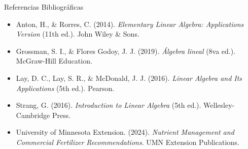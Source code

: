 \documentclass[
  spanish,
  aspectratio=169,
  xcolor={dvipsnames,table}
]{beamer}
\begin{document}
\begin{frame}{Referencias Bibliográficas}
  \fontsize{8}{10}\selectfont
  \begin{itemize}
    \item Anton, H., \& Rorres, C. (2014). \textit{Elementary Linear Algebra: Applications Version} (11th ed.). John Wiley \& Sons.
    \item Grossman, S. I., \& Flores Godoy, J. J. (2019). \textit{Álgebra lineal} (8va ed.). McGraw-Hill Education.
    \item Lay, D. C., Lay, S. R., \& McDonald, J. J. (2016). \textit{Linear Algebra and Its Applications} (5th ed.). Pearson.
    \item Strang, G. (2016). \textit{Introduction to Linear Algebra} (5th ed.). Wellesley-Cambridge Press.
    \item University of Minnesota Extension. (2024). \textit{Nutrient Management and Commercial Fertilizer Recommendations}. UMN Extension Publications.
  \end{itemize}
\end{frame}
\end{document}
